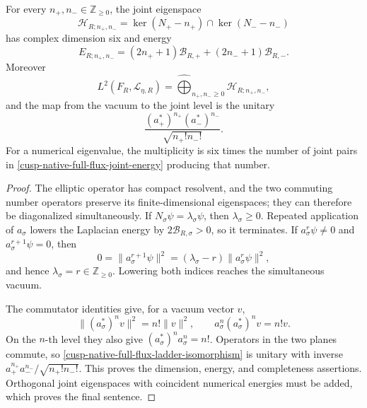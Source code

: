 \begin{theorem}
\label{cusp-native-full-flux-landau-theorem}
For every \(n_+,n_-\in\mathbb Z_{\ge0}\), the joint eigenspace
\begin{equation}
 \mathcal H_{R;n_+,n_-}
 =\ker(N_+-n_+)\cap\ker(N_--n_-)
 \label{cusp-native-full-flux-joint-space}
\end{equation}
has complex dimension six and energy
\begin{equation}
 E_{R;n_+,n_-}
 =(2n_++1)\mathcal B_{R,+}
 +(2n_-+1)\mathcal B_{R,-}.
 \label{cusp-native-full-flux-joint-energy}
\end{equation}
Moreover
\begin{equation}
 L^2(F_R,\mathscr L_{\eta,R})
 =\widehat{\bigoplus}_{n_+,n_-\ge0}\mathcal H_{R;n_+,n_-},
 \label{cusp-native-full-flux-complete-decomposition}
\end{equation}
and the map from the vacuum to the joint level is the unitary
\begin{equation}
 \frac{(a_+^*)^{n_+}(a_-^*)^{n_-}}{\sqrt{n_+!n_-!}}.
 \label{cusp-native-full-flux-ladder-isomorphism}
\end{equation}
For a numerical eigenvalue, the multiplicity is six times the number of
joint pairs in \cref{cusp-native-full-flux-joint-energy} producing that
number.
\end{theorem}

\begin{proof}
The elliptic operator has compact resolvent, and the two commuting number
operators preserve its finite-dimensional eigenspaces; they can therefore be
diagonalized simultaneously.  If \(N_\sigma\psi=\lambda_\sigma\psi\), then
\(\lambda_\sigma\ge0\).  Repeated application of \(a_\sigma\) lowers the
Laplacian energy by \(2\mathcal B_{R,\sigma}>0\), so it terminates.  If
\(a_\sigma^r\psi\ne0\) and \(a_\sigma^{r+1}\psi=0\), then
\[
 0=\|a_\sigma^{r+1}\psi\|^2
  =(\lambda_\sigma-r)\|a_\sigma^r\psi\|^2,
\]
and hence \(\lambda_\sigma=r\in\mathbb Z_{\ge0}\).  Lowering both indices
reaches the simultaneous vacuum.

The commutator identities give, for a vacuum vector \(v\),
\[
 \|(a_\sigma^*)^nv\|^2=n!\|v\|^2,
 \qquad a_\sigma^n(a_\sigma^*)^nv=n!v.
\]
On the \(n\)-th level they also give
\((a_\sigma^*)^na_\sigma^n=n!\).  Operators in the two planes commute, so
\cref{cusp-native-full-flux-ladder-isomorphism} is unitary with inverse
\(a_+^{n_+}a_-^{n_-}/\sqrt{n_+!n_-!}\).  This proves the dimension, energy,
and completeness assertions.  Orthogonal joint eigenspaces with coincident
numerical energies must be added, which proves the final sentence.
\end{proof}

